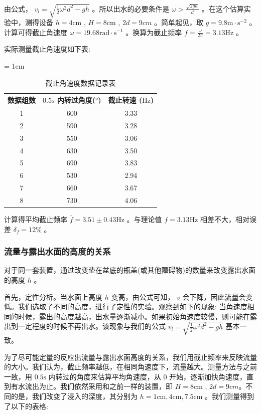 \documentclass[fontset=windows]{article}
\begin{document}
由公式， $v_l = \sqrt{\frac{1}{2}\omega^2 d^2 - gh}$ 。所以出水的必要条件是 $\omega > \frac{\sqrt{2gh}}{d} $ 。在这个估算实验中，测得设备 $h = 4\text{cm}$ , $H = 8\text{cm}$ , $2d = 9cm$ 。简单起见，取 $g = 9.8 \text{m}\cdot\text{s}^{-2}$ 。计算可得截止角速度 $\omega = 19.68 \text{rad} \cdot \text{s}^{-1} $ 。换算为截止频率 $f = \frac{\omega}{2\pi} = 3.13 \text{Hz} $ 。

实际测量截止角速度如下表:

\begin{table}[htbp]
    \centering
    \caption{截止角速度数据记录表}
    \label{table1}
    \renewcommand\arraystretch{1.5}
    \tabcolsep = 1cm
    \begin{tabular}{|c|c|c|}
        \hline
        数据组数 & $0.5\text{s}$ 内转过角度($\text{°}$)  & 截止转速 ($\text{Hz}$) \\
        \hline
        1 & 600 & 3.33 \\
        \hline
        2 & 590 & 3.28 \\
        \hline
        3 & 550 & 3.06 \\ 
        \hline
        4 & 630 & 3.50 \\
        \hline
        5 & 690 & 3.83 \\
        \hline
        6 & 530 & 2.94 \\
        \hline
        7 & 660 & 3.67 \\
        \hline
        8 & 730 & 4.06 \\
        \hline
    \end{tabular}
\end{table}

计算得平均截止频率 $\bar{f} = 3.51 \pm 0.43 \text{Hz}$ 。与理论值 $f = 3.13 \text{Hz}$ 相差不大，相对误差 $\delta_f = 12\%$ 。

\subsubsection{流量与露出水面的高度的关系}

对于同一套装置，通过改变垫在盆底的瓶盖(或其他障碍物)的数量来改变露出水面的高度 $h$ 。

首先，定性分析。当水面上高度 $h$ 变高，由公式可知， $v$ 会下降，因此流量会变低。我们选取了不同的高度，进行了定性的实验。观察到如下的现象:   当角速度相同的时候，露出的高度越高，出水量逐渐减小。如果初始角速度较慢，则可能在露出到一定程度的时候不再出水。该现象与我们的公式 $v_l = \sqrt{\frac{1}{2}\omega^2 d^2 - gh} $ 基本一致。

为了尽可能定量的反应出流量与露出水面高度的关系，我们用截止频率来反映流量的大小。我们认为，截止频率越低，在相同角速度下，流量越大。测量方法与之前一致，用 $0.5\text{s}$ 内转过的角度来估算平均角速度，从 $0$ 开始，逐渐加快角速度，直到有水流出为止。我们依然采用和之前一样的装置，即 $H = 8\text{cm}$ , $2d = 9cm$。不同的是，我们改变了浸入的深度，其分别为 $h = 1\text{cm}, 4\text{cm} , 7.5\text{cm}$ 。我们测量得到了以下的表格:
\end{document}
